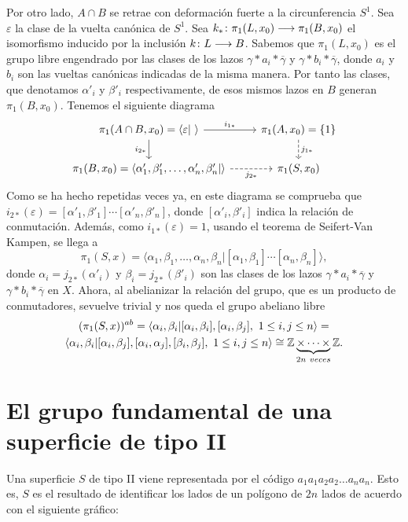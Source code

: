 \documentclass[GTS.tex]{subfiles}
\begin{document}
Por otro lado, $A\cap B$ se retrae con deformación fuerte a la circunferencia $S^1$. Sea $\varepsilon$  la clase de la vuelta canónica de $S^1$. Sea $k_*\colon{\pi_1(L,x_0)}\longrightarrow{\pi_1(B,x_0)}$ el isomorfismo inducido por la inclusión $k\colon{L}\longrightarrow{B}$. Sabemos que $\pi_1(L,x_0)$ es el grupo libre engendrado por las clases de los lazos $\gamma*a_i*\overline{\gamma}$ y $\gamma*b_i*\overline{\gamma}$, donde $a_i$ y $b_i$ son las vueltas canónicas indicadas de la misma manera.  Por tanto las clases, que denotamos $\alpha'_i$ y $\beta'_i$ respectivamente, de esos mismos lazos en $B$ generan $\pi_1(B,x_0)$. Tenemos el siguiente diagrama
\[
\begin{tikzcd}
\pi_1(A\cap B,x_0)=\langle\varepsilon|\ \rangle \ar[r, "i_{1*}"]\arrow[d,"i_{2*}"'] & \pi_1(A,x_0)=\{1\}\arrow[d, dashed, "j_{1*}"]\\
\pi_1(B,x_0)=\langle \alpha'_1,\beta'_1,\dots,\alpha'_n,\beta'_n| \rangle\arrow[r,dashed,"j_{2*}"'] & \pi_1(S,x_0)
\end{tikzcd}
\]
Como se ha hecho repetidas veces ya, en este diagrama se comprueba que $i_{2*}(\varepsilon)=[\alpha'_1,\beta'_1]\cdots[\alpha'_n,\beta'_n]$, donde $[\alpha'_i,\beta'_i]$ indica la relación de conmutación. Además, como $i_{1*}(\varepsilon)=1$, usando el teorema de Seifert-Van Kampen, se llega a 
\[
\pi_1(S,x)=\langle \alpha_1,\beta_1,\dots,\alpha_n,\beta_n|[\alpha_1,\beta_1]\cdots[\alpha_n,\beta_n]\rangle,
\]
donde $\alpha_i=j_{2*}(\alpha'_i)$ y $\beta_i=j_{2*}(\beta'_i)$ son las clases de los lazos  $\gamma*a_i*\overline{\gamma}$ y $\gamma*b_i*\overline{\gamma}$ en $X$. Ahora, al abelianizar la relación del grupo, que es un producto de conmutadores, sevuelve trivial y nos queda el grupo abeliano libre
\begin{gather*}
(\pi_1(S,x))^{ab}=\langle \alpha_i, \beta_i|[\alpha_i,\beta_i],[\alpha_i,\beta_j],\ 1\leq i, j\leq n\rangle=\\
\langle \alpha_i, \beta_i|[\alpha_i,\beta_j],[\alpha_i,\alpha_j], [\beta_i,\beta_j],\ 1\leq i, j\leq n\rangle\cong\mathbb{Z}\underbrace{\times\cdots\times}_{2n\ veces}\mathbb{Z}.
\end{gather*}


\section{El grupo fundamental de una superficie de tipo II}
Una superficie $S$ de tipo II viene representada por el código $a_1 a_1 a_2 a_2\dots a_n a_n$. Esto es, $S$ es el resultado de identificar los lados de un polígono de $2n$ lados de acuerdo con el siguiente gráfico:
\end{document}
